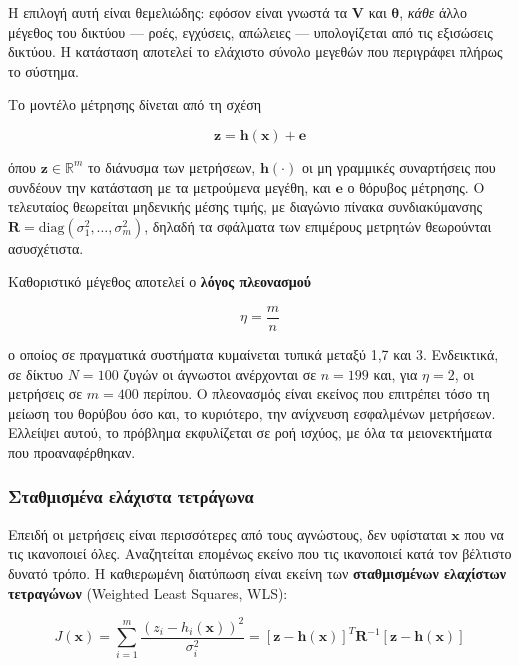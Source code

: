Η επιλογή αυτή είναι θεμελιώδης: εφόσον είναι γνωστά τα $\mathbf{V}$ και
$\boldsymbol{\theta}$, \emph{κάθε} άλλο μέγεθος του δικτύου — ροές, εγχύσεις, απώλειες —
υπολογίζεται από τις εξισώσεις δικτύου. Η κατάσταση αποτελεί το ελάχιστο σύνολο μεγεθών που
περιγράφει πλήρως το σύστημα.

Το μοντέλο μέτρησης δίνεται από τη σχέση

\begin{equation}
\mathbf{z} = \mathbf{h}(\mathbf{x}) + \mathbf{e}
\label{eq:measmodel}
\end{equation}

όπου $\mathbf{z} \in \mathbb{R}^{m}$ το διάνυσμα των μετρήσεων, $\mathbf{h}(\cdot)$ οι μη
γραμμικές συναρτήσεις που συνδέουν την κατάσταση με τα μετρούμενα μεγέθη, και $\mathbf{e}$
ο θόρυβος μέτρησης. Ο τελευταίος θεωρείται μηδενικής μέσης τιμής, με διαγώνιο πίνακα
συνδιακύμανσης $\mathbf{R} = \mathrm{diag}(\sigma_1^2, \ldots, \sigma_m^2)$, δηλαδή τα
σφάλματα των επιμέρους μετρητών θεωρούνται ασυσχέτιστα.

Καθοριστικό μέγεθος αποτελεί ο \textbf{λόγος πλεονασμού}

\begin{equation}
\eta = \frac{m}{n}
\label{eq:redundancy}
\end{equation}

ο οποίος σε πραγματικά συστήματα κυμαίνεται τυπικά μεταξύ 1,7 και 3. Ενδεικτικά, σε δίκτυο
$N = 100$ ζυγών οι άγνωστοι ανέρχονται σε $n = 199$ και, για $\eta = 2$, οι μετρήσεις σε
$m = 400$ περίπου. Ο πλεονασμός είναι εκείνος που επιτρέπει τόσο τη μείωση του θορύβου όσο
και, το κυριότερο, την ανίχνευση εσφαλμένων μετρήσεων. Ελλείψει αυτού, το πρόβλημα
εκφυλίζεται σε ροή ισχύος, με όλα τα μειονεκτήματα που προαναφέρθηκαν.

\subsubsection*{Σταθμισμένα ελάχιστα τετράγωνα}

Επειδή οι μετρήσεις είναι περισσότερες από τους αγνώστους, δεν υφίσταται $\mathbf{x}$ που
να τις ικανοποιεί όλες. Αναζητείται επομένως εκείνο που τις ικανοποιεί κατά τον βέλτιστο
δυνατό τρόπο. Η καθιερωμένη διατύπωση είναι εκείνη των \textbf{σταθμισμένων ελαχίστων
τετραγώνων} (Weighted Least Squares, WLS):

\begin{equation}
J(\mathbf{x}) = \sum_{i=1}^{m} \frac{\left(z_i - h_i(\mathbf{x})\right)^2}{\sigma_i^2}
             = \left[\mathbf{z}-\mathbf{h}(\mathbf{x})\right]^{T} \mathbf{R}^{-1}
               \left[\mathbf{z}-\mathbf{h}(\mathbf{x})\right]
\label{eq:wls}
\end{equation}

